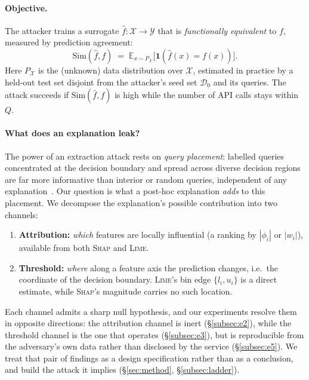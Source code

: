 \documentclass[sigconf,anonymous,review]{acmart}
\begin{document}
\paragraph{Objective.}
The attacker trains a surrogate $\hat{f} : \mathcal{X} \to \mathcal{Y}$ that is
\emph{functionally equivalent} to $f$, measured by prediction agreement:
\begin{equation}
    \mathrm{Sim}(\hat{f}, f) \;=\; \mathbb{E}_{x \sim P_{\mathcal{X}}}
    \bigl[\mathbf{1}(\hat{f}(x) = f(x))\bigr].
    \label{eq:sim}
\end{equation}
Here $P_{\mathcal{X}}$ is the (unknown) data distribution over $\mathcal{X}$,
estimated in practice by a held-out test set disjoint from the attacker's seed set
$\mathcal{D}_{0}$ and its queries.
The attack succeeds if $\mathrm{Sim}(\hat{f}, f)$ is high while the number of API
calls stays within $Q$. 

\paragraph{What does an explanation leak?}
The power of an extraction attack rests on \emph{query placement}: labelled queries
concentrated at the decision boundary and spread across diverse decision regions are far
more informative than interior or random queries, independent of any
explanation~\cite{pal2020activethief}. Our question is what a post-hoc explanation
\emph{adds} to this placement. We decompose the explanation's possible contribution into
two channels:
\begin{enumerate}
  \item \textbf{Attribution:} \emph{which} features are locally influential
  (a ranking by $|\phi_i|$ or $|w_i|$), available from both \textsc{Shap} and
  \textsc{Lime}.
  \item \textbf{Threshold:} \emph{where} along a feature axis the prediction
  changes, i.e.\ the coordinate of the decision boundary. \textsc{Lime}'s bin edge
  $\{l_i, u_i\}$ is a direct estimate, while \textsc{Shap}'s magnitude carries no such
  location.
\end{enumerate}
Each channel admits a sharp null hypothesis, and our experiments resolve them in opposite directions:
the attribution channel is inert (\S\ref{subsec:e2}), while the threshold channel is the one that
operates (\S\ref{subsec:e3}), but is reproducible from the adversary's own data rather than disclosed
by the service (\S\ref{subsec:e5}). We treat that pair of findings as a design specification rather
than as a conclusion, and build the attack it implies (\S\ref{sec:method}, \S\ref{subsec:ladder}).
\end{document}
